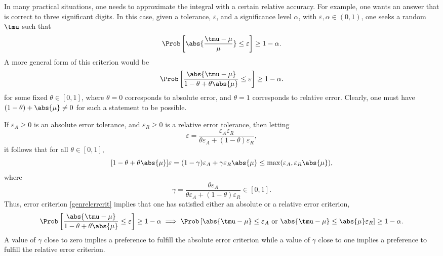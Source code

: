 \documentclass[graybox]{svmult}
\begin{document}
In many practical situations, one needs to approximate the integral with a certain relative accuracy.  For example, one wants an answer that is correct to three significant digits.  In this case, given a tolerance, $\varepsilon$, and a significance level $\alpha$, with $\varepsilon, \alpha \in (0, 1)$, one seeks a random $\tmu$ such that 
\begin{equation*} \label{relerrcrit}
\Prob\left[\abs{\frac{\tmu-\mu}{\mu}} \le \varepsilon \right] \geq 1-\alpha.
\end{equation*}
A more general form of this criterion would be
\begin{equation} \label{genrelerrcrit}
\Prob\left[\frac{\abs{\tmu-\mu}} {1-\theta + \theta\abs{\mu}} \le \varepsilon \right] \geq 1-\alpha.
\end{equation}
for some fixed $\theta \in [0,1]$, where $\theta=0$ corresponds to absolute error, and $\theta = 1$ corresponds to relative error.  Clearly, one must have $(1-\theta) + \abs{\mu}\ne0$ for such a statement to be possible.  

If $\varepsilon_{A} \ge 0$ is an absolute error tolerance, and $\varepsilon_{R} \ge 0$ is a relative error tolerance, then letting 
\[
\varepsilon = \frac{\varepsilon_{A}\varepsilon_{R}}{\theta \varepsilon_{A} + (1-\theta) \varepsilon_{R}},
\]
it follows that for all $\theta \in [0,1]$,
\[
[1-\theta + \theta \abs{\mu}]\varepsilon = (1-\gamma)\varepsilon_{A} + \gamma \varepsilon_{R} \abs{\mu} \le \max(\varepsilon_{A},\varepsilon_{R} \abs{\mu}),
\]
where
\[
\gamma = \frac{\theta \varepsilon_{A}}{\theta \varepsilon_{A} + (1-\theta) \varepsilon_{R}} \in [0,1].
\]
Thus, error criterion  \eqref{genrelerrcrit} implies that one has satisfied either an absolute or a relative error criterion, 
\[
\Prob\left[\frac{\abs{\tmu-\mu}} {1-\theta + \theta\abs{\mu}} \le \varepsilon \right] \geq 1-\alpha \implies \Prob\left[\abs{\tmu-\mu} \le \varepsilon_A \text{ or } \abs{\tmu-\mu} \le \abs{\mu}\varepsilon_R \right] \geq 1-\alpha.
\]
A value of $\gamma$ close to zero implies a preference to fulfill the absolute error criterion while a value of $\gamma$ close to one implies a preference to fulfill the relative error criterion.
\end{document}
